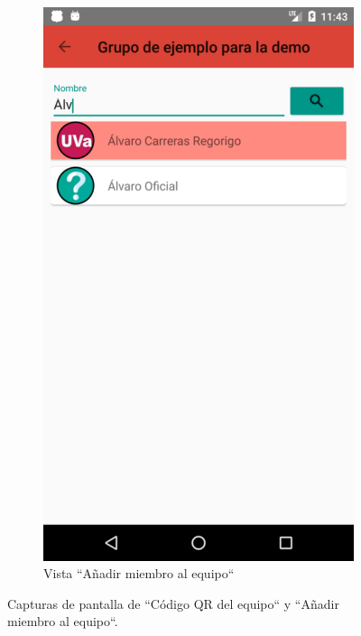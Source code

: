\documentclass[twoside]{report}
\begin{document}
\begin{figure}[H]
\begin{center}
\begin{subfigure}[t]{.3\linewidth}
		\includegraphics[scale=0.2]{images/userguide/20.png}
		\caption{Vista “Añadir miembro al equipo“}
	\end{subfigure}\hspace{5mm}%
\caption{Capturas de pantalla de “Código QR del equipo“ y “Añadir miembro al equipo“.}
\end{center}
\end{figure}
\end{document}
